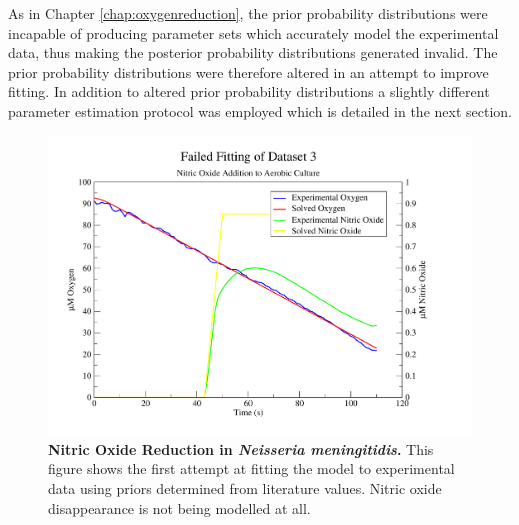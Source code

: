 As in Chapter \ref{chap:oxygenreduction}, the prior probability distributions were incapable of producing parameter sets which accurately model the experimental data, thus making the posterior probability distributions generated invalid. The prior probability distributions were therefore altered in an attempt to improve fitting. In addition to altered prior probability distributions a slightly different parameter estimation protocol was employed which is detailed in the next section.

\begin{figure}[tbp]
 \centering
 \includegraphics[width=15cm, trim=1cm 1cm 3cm 1cm, clip=true]{./06-noreduction/data/aer-no-sim1.pdf}
 \caption[{Nitric Oxide Reduction in \textit{Neisseria meningitidis}.}]{{\bf Nitric Oxide Reduction in \textit{Neisseria meningitidis}.} This figure shows the first attempt at fitting the model to experimental data using priors determined from literature values. Nitric oxide disappearance is not being modelled at all.}
 \label{fig:nosim1.1}
\end{figure}

